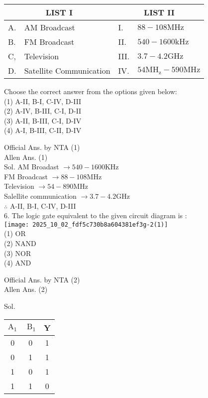 \documentclass[10pt]{article}
\begin{document}
\begin{center}
\begin{tabular}{|l|l|l|l|}
\hline
\multicolumn{2}{|c|}{LIST I} & \multicolumn{2}{c|}{LIST II} \\
\hline
A. & AM Broadcast & I. & \(88-108 \mathrm{MHz}\) \\
\hline
B. & FM Broadcast & II. & \(540-1600 \mathrm{kHz}\) \\
\hline
C, & Television & III. & \(3.7-4.2 \mathrm{GHz}\) \\
\hline
D. & Satellite Communication & IV. & \(54 \mathrm{MH}_{\mathrm{z}}-590 \mathrm{MHz}\) \\
\hline
\end{tabular}
\end{center}

Choose the correct answer from the options given below:\\
(1) A-II, B-I, C-IV, D-III\\
(2) A-IV, B-III, C-I, D-II\\
(3) A-II, B-III, C-I, D-IV\\
(4) A-I, B-III, C-II, D-IV

Official Ans. by NTA (1)\\
Allen Ans. (1)\\
Sol. AM Broadast \(\rightarrow 540-1600 \mathrm{KHz}\)\\
FM Broadcast \(\rightarrow 88-108 \mathrm{MHz}\)\\
Television \(\rightarrow 54-890 \mathrm{MHz}\)\\
Salellite communication \(\rightarrow 3.7-4.2 \mathrm{GHz}\)\\
\(\therefore\) A-II, B-I, C-IV, D-III\\
6. The logic gate equivalent to the given circuit diagram is :\\
\texttt{[image: 2025\_10\_02\_fdf5c730b8a604381ef3g-2(1)]}\\
(1) OR\\
(2) NAND\\
(3) NOR\\
(4) AND

Official Ans. by NTA (2)\\
Allen Ans. (2)

Sol.

\begin{center}
\begin{tabular}{|c|c|c|}
\hline
\(\mathrm{A}_{1}\) & \(\mathrm{~B}_{1}\) & Y \\
\hline
0 & 0 & 1 \\
\hline
0 & 1 & 1 \\
\hline
1 & 0 & 1 \\
\hline
1 & 1 & 0 \\
\hline
\end{tabular}
\end{center}
\end{document}
